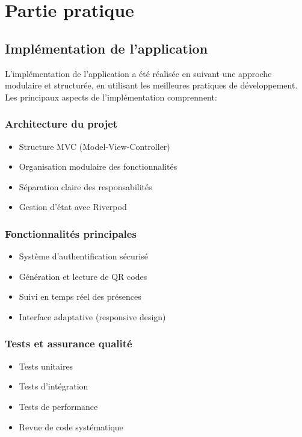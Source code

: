 \section{Partie pratique}
\label{sec:practical}

\subsection{Implémentation de l'application}
L'implémentation de l'application a été réalisée en suivant une approche modulaire et structurée, en utilisant les meilleures pratiques de développement. Les principaux aspects de l'implémentation comprennent:

\subsubsection{Architecture du projet}
\begin{itemize}
    \item Structure MVC (Model-View-Controller)
    \item Organisation modulaire des fonctionnalités
    \item Séparation claire des responsabilités
    \item Gestion d'état avec Riverpod
\end{itemize}

\subsubsection{Fonctionnalités principales}
\begin{itemize}
    \item Système d'authentification sécurisé
    \item Génération et lecture de QR codes
    \item Suivi en temps réel des présences
    \item Interface adaptative (responsive design)
\end{itemize}

\subsubsection{Tests et assurance qualité}
\begin{itemize}
    \item Tests unitaires
    \item Tests d'intégration
    \item Tests de performance
    \item Revue de code systématique
\end{itemize}

